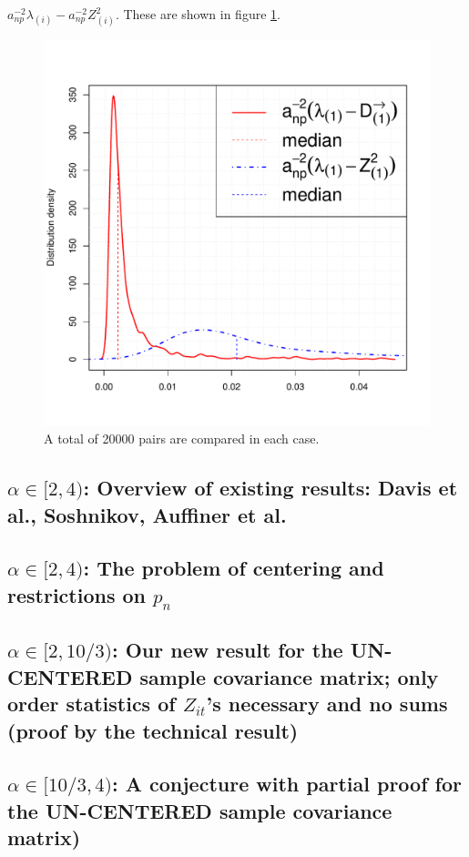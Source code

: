 \documentclass[11pt,reqno]{amsart}
\newcommand{\1}{\mathds{1}}
\newcommand{\0}{\boldsymbol{0}}
\newcommand{\4}{\mathchoice{\mskip1.5mu}{\mskip1.5mu}{}{}}
\newcommand{\5}{\mathchoice{\mskip-1.5mu}{\mskip-1.5mu}{}{}}
\newcommand{\2}{\penalty250\mskip\thickmuskip\mskip-\thinmuskip} %
\begin{document}
$a_{np}^{-2}\lambda_{(i)} - a_{np}^{-2}Z^2_{(i)}$. These are shown in
figure \ref{fig:lambda_comparison}.
\begin{figure}[htb!]
  \centering
  \includegraphics[scale=0.40]{lambda_comparison.pdf}
  \caption{A total of 20000 pairs are compared in each case.}
  \label{fig:lambda_comparison}
\end{figure}




\subsection{$\alpha \in [2,4)$: Overview of existing results: Davis et
  al., Soshnikov, Auffiner et al.} 
\subsection{$\alpha \in [2,4)$: The problem of centering and restrictions on $p_n$}
\subsection{$\alpha \in [2,10/3)$: Our new result for the UN-CENTERED
  sample covariance matrix; only order statistics of $Z_{it}$'s
  necessary and no sums (proof by the technical result)}
\subsection{$\alpha \in [10/3,4)$: A conjecture with partial proof for
  the UN-CENTERED sample covariance matrix)}
\end{document}

